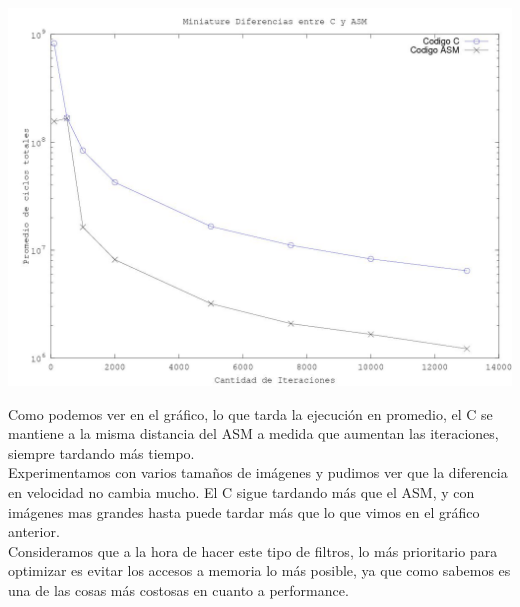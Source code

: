 \begin{center}
\includegraphics[width=16cm]{imagenes/medicionMiniature.jpg}  
\end{center}

Como podemos ver en el gr\'afico, lo que tarda la ejecuci\'on en promedio, el C se mantiene a la misma distancia del ASM a medida que aumentan las iteraciones, siempre tardando m\'as tiempo.\\

Experimentamos con varios tamaños de im\'agenes y pudimos ver que la diferencia en velocidad no cambia mucho. El C sigue tardando m\'as que el ASM, y con im\'agenes mas grandes hasta puede tardar m\'as que lo que vimos en el gr\'afico anterior.\\
Consideramos que a la hora de hacer este tipo de filtros, lo m\'as prioritario para optimizar es evitar los accesos a memoria lo m\'as posible, ya que como sabemos es una de las cosas m\'as costosas en cuanto a performance.\\



